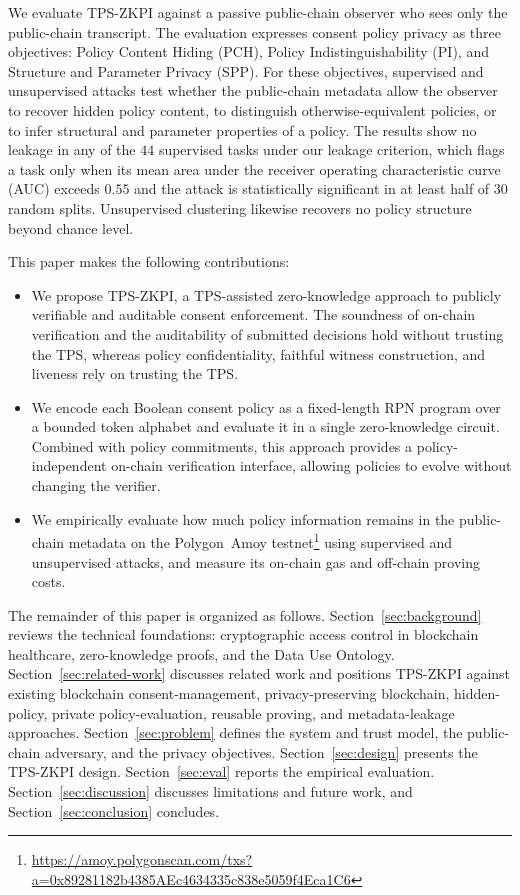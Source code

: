 We evaluate TPS-ZKPI against a passive public-chain observer who sees only the public-chain transcript.
The evaluation expresses consent policy privacy as three objectives: Policy Content Hiding (PCH), Policy Indistinguishability (PI), and Structure and Parameter Privacy (SPP).
For these objectives, supervised and unsupervised attacks test whether the public-chain metadata allow the observer to recover hidden policy content, to distinguish otherwise-equivalent policies, or to infer structural and parameter properties of a policy.
The results show no leakage in any of the $44$ supervised tasks under our leakage criterion, which flags a task only when its mean area under the receiver operating characteristic curve (AUC) exceeds $0.55$ and the attack is statistically significant in at least half of $30$ random splits.
Unsupervised clustering likewise recovers no policy structure beyond chance level.

This paper makes the following contributions:

\begin{itemize}
	\item We propose TPS-ZKPI, a TPS-assisted zero-knowledge approach to publicly verifiable and auditable consent enforcement. The soundness of on-chain verification and the auditability of submitted decisions hold without trusting the TPS, whereas policy confidentiality, faithful witness construction, and liveness rely on trusting the TPS.

	\item We encode each Boolean consent policy as a fixed-length RPN program over a bounded token alphabet and evaluate it in a single zero-knowledge circuit. Combined with policy commitments, this approach provides a policy-independent on-chain verification interface, allowing policies to evolve without changing the verifier.

	\item We empirically evaluate how much policy information remains in the public-chain metadata on the Polygon~Amoy testnet\footnote{\url{https://amoy.polygonscan.com/txs?a=0x89281182b4385AEc4634335c838e5059f4Eca1C6}} using supervised and unsupervised attacks, and measure its on-chain gas and off-chain proving costs.
\end{itemize}

The remainder of this paper is organized as follows.
Section~\ref{sec:background} reviews the technical foundations: cryptographic access control in blockchain healthcare, zero-knowledge proofs, and the Data Use Ontology.
Section~\ref{sec:related-work} discusses related work and positions TPS-ZKPI against existing blockchain consent-management, privacy-preserving blockchain, hidden-policy, private policy-evaluation, reusable proving, and metadata-leakage approaches.
Section~\ref{sec:problem} defines the system and trust model, the public-chain adversary, and the privacy objectives.
Section~\ref{sec:design} presents the TPS-ZKPI design.
Section~\ref{sec:eval} reports the empirical evaluation.
Section~\ref{sec:discussion} discusses limitations and future work, and
Section~\ref{sec:conclusion} concludes.
